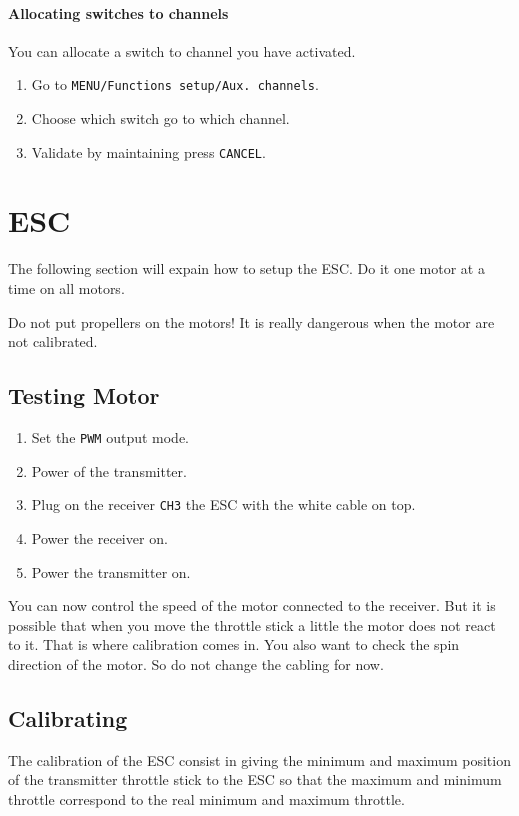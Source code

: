             \paragraph{Allocating switches to channels}
                You can allocate a switch to channel you have activated.
                \begin{enumerate}
                    \item Go to \texttt{MENU/Functions setup/Aux. channels}.
                    \item Choose which switch go to which channel.
                    \item Validate by maintaining press \texttt{CANCEL}.
                \end{enumerate}
        
    \section{ESC}
        The following section will expain how to setup the ESC.
        Do it one motor at a time on all motors. 
        
        Do not put propellers on the motors! It is really dangerous when the motor are not calibrated.
        \subsection{Testing Motor}
            
            \begin{enumerate}
                \item Set the \texttt{PWM} output mode.
                \item Power of the transmitter.
                \item Plug on the receiver \texttt{CH3} the ESC with the white cable on top.
                \item Power the receiver on.
                \item Power the transmitter on.
            \end{enumerate}
            You can now control the speed of the motor connected to the receiver. But it is possible that when you move the throttle stick a little the motor does not react to it. That is where calibration comes in. You also want to check the spin direction of the motor. So do not change the cabling for now.
            
        \subsection{Calibrating}
            The calibration of the ESC consist in giving the minimum and maximum position of the transmitter throttle stick to the ESC so that the maximum and minimum throttle correspond to the real minimum and maximum throttle.
            
